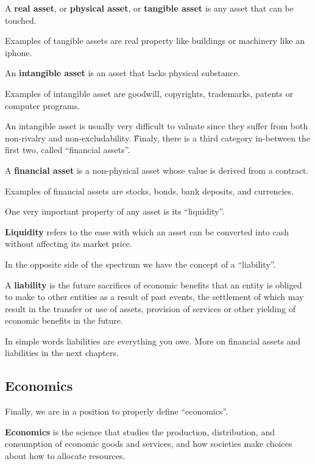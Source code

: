 A \textbf{real asset}, or \textbf{physical asset}, or \textbf{tangible asset} is any asset that can be touched.
\ed

\be
Examples of tangible assets are real property like buildings or machinery like an iphone.
\ee

An \textbf{intangible asset} is an asset that lacks physical substance.
\ed

\be
Examples of intangible asset are goodwill, copyrights, trademarks, patents or computer programs.
\ee

An intangible asset is usually very difficult to valuate since they suffer from both non-rivalry and non-excludability.
\v

Finaly, there is a third category in-between the first two, called ``financial assets''.

A \textbf{financial asset} is a non-physical asset whose value is derived from a contract.
\ed

\be
Examples of financial assets are stocks, bonds, bank deposits, and currencies.
\ee

One very important property of any asset is its ``liquidity''.

\bd[Liquidity]
\textbf{Liquidity} refers to the ease with which an asset can be converted into cash without affecting its market price.
\ed

In the opposite side of the spectrum we have the concept of a ``liability''.

\bd[Liability]
A \textbf{liability} is the future sacrifices of economic benefits that an entity is obliged to make to other entities
as a result of past events, the settlement of which may result in the transfer or use of assets, provision of services
or other yielding of economic benefits in the future.
\ed

In simple words liabilities are everything you owe. More on financial assets and liabilities in the next chapters.

\subsection{Economics}

Finally, we are in a position to properly define ``economics''.

\bd[Economics]
\textbf{Economics} is the science that studies the production, distribution, and consumption of economic goods and
services, and how societies make choices about how to allocate resources.
\ed

